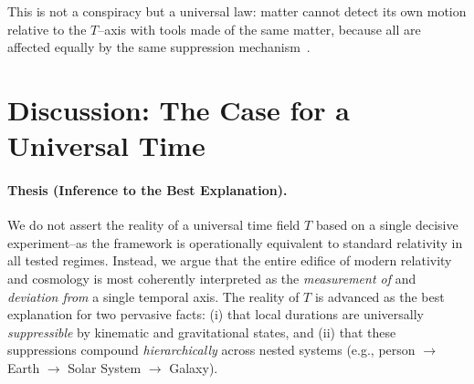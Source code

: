 \documentclass[12pt]{article}
\theoremstyle{plain}
\begin{document}
\noindent
This is not a conspiracy but a universal law: matter cannot detect its own motion relative to the $T$–axis with tools made of the same matter, because all are affected equally by the same suppression mechanism~\cite{HafeleKeating1972a,HafeleKeating1972b}.

\section{Discussion: The Case for a Universal Time}
\label{sec:discussion}
\paragraph{Thesis (Inference to the Best Explanation).}
We do not assert the reality of a universal time field $T$ based on a single decisive experiment–as the framework is operationally equivalent to standard relativity in all tested regimes. Instead, we argue that the entire edifice of modern relativity and cosmology is most coherently interpreted as the \emph{measurement of} and \emph{deviation from} a single temporal axis. The reality of $T$ is advanced as the best explanation for two pervasive facts: (i) that local durations are universally \emph{suppressible} by kinematic and gravitational states, and (ii) that these suppressions compound \emph{hierarchically} across nested systems (e.g., person $\to$ Earth $\to$ Solar System $\to$ Galaxy).
\end{document}
